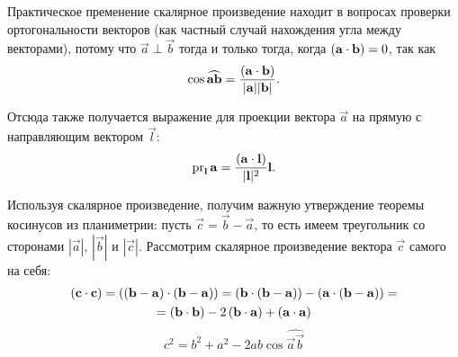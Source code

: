 	Практическое пременение скалярное произведение находит в вопросах проверки ортогональности векторов (как частный случай нахождения угла между векторами), потому что $\vec{a} \perp \vec{b}$ тогда и только тогда, когда $\left(\mathbf{a} \cdot \mathbf{b}\right) = 0$, так как
	\begin{equation}
		\cos \widehat{\mathbf{a}\mathbf{b}} = \frac{\left(\mathbf{a} \cdot \mathbf{b}\right)}{|\mathbf{a}||\mathbf{b}|}.
	\end{equation}
	
	Отсюда также получается выражение для проекции вектора $\vec{a}$ на прямую с направляющим вектором $\vec{l}$:
	\begin{equation}
		\operatorname{pr}_{\mathbf{l}} \mathbf{a} = \frac{\left(\mathbf{a} \cdot \mathbf{l}\right)}{|\mathbf{l}|^2} \mathbf{l}.
	\end{equation}
	
	Используя скалярное произведение, получим важную утверждение теоремы косинусов из планиметрии: пусть $\vec{c} = \vec{b} - \vec{a}$, то есть имеем треугольник со сторонами $|\vec{a}|$, $|\vec{b}|$ и $|\vec{c}|$. Рассмотрим скалярное произведение вектора $\vec{c}$ самого на себя:
	\begin{multline}
		\left(\mathbf{c} \cdot \mathbf{c}\right) = \left(\mathbf{(b - a)} \cdot \mathbf{(b - a)}\right) = \left(\mathbf{b} \cdot \mathbf{(b-a)}\right) - \left(\mathbf{a} \cdot \mathbf{(b - a)}\right) = \\
		= \left(\mathbf{b} \cdot \mathbf{b}\right) - 2\left(\mathbf{b} \cdot \mathbf{a}\right) + \left(\mathbf{a} \cdot \mathbf{a}\right) 
	\end{multline}
	\begin{equation}
		c^2 = b^2 + a^2 - 2ab\cos \widehat{\vec{a}\vec{b}}
	\end{equation}